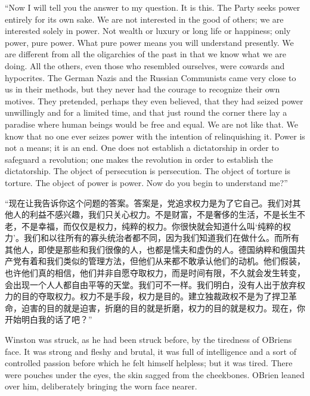 \begin{paracol}{2}
``Now I will tell you the answer to my question. It is this. The Party
seeks power entirely for its own sake. We are not interested in the good
of others; we are interested solely in power. Not wealth or luxury or
long life or happiness; only power, pure power. What pure power means
you will understand presently. We are different from all the oligarchies
of the past in that we know what we are doing. All the others, even
those who resembled ourselves, were cowards and hypocrites. The German
Nazis and the Russian Communists came very close to us in their methods,
but they never had the courage to recognize their own motives. They
pretended, perhaps they even believed, that they had seized power
unwillingly and for a limited time, and that just round the corner there
lay a paradise where human beings would be free and equal. We are not
like that. We know that no one ever seizes power with the intention of
relinquishing it. Power is not a means; it is an end. One does not
establish a dictatorship in order to safeguard a revolution; one makes
the revolution in order to establish the dictatorship. The object of
persecution is persecution. The object of torture is torture. The object
of power is power. Now do you begin to understand me?''

\switchcolumn

``现在让我告诉你这个问题的答案。答案是，党追求权力是为了它自己。我们对其他人的利益不感兴趣，我们只关心权力。不是财富，不是奢侈的生活，不是长生不老，不是幸福，而仅仅是权力，纯粹的权力。你很快就会知道什么叫`纯粹的权力'。我们和以往所有的寡头统治者都不同，因为我们知道我们在做什么。而所有其他人，即使是那些和我们很像的人，也都是懦夫和虚伪的人。德国纳粹和俄国共产党有着和我们类似的管理方法，但他们从来都不敢承认他们的动机。他们假装，也许他们真的相信，他们并非自愿夺取权力，而是时间有限，不久就会发生转变，会出现一个人人都自由平等的天堂。我们可不一样。我们明白，没有人出于放弃权力的目的夺取权力。权力不是手段，权力是目的。建立独裁政权不是为了捍卫革命，迫害的目的就是迫害，折磨的目的就是折磨，权力的目的就是权力。现在，你开始明白我的话了吧？''

\switchcolumn*

Winston was struck, as he had been struck before, by the tiredness of
O\textquotesingle Brien\textquotesingle s face. It was strong and fleshy
and brutal, it was full of intelligence and a sort of controlled passion
before which he felt himself helpless; but it was tired. There were
pouches under the eyes, the skin sagged from the cheekbones.
O\textquotesingle Brien leaned over him, deliberately bringing the worn
face nearer.


\end{paracol}
